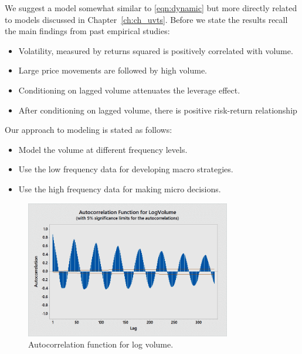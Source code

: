 We suggest a model somewhat similar to \eqref{eqn:dynamic} but more directly related to models discussed in Chapter~\ref{ch:ch_uvts}. Before we state the results recall the main findings from past empirical studies:
	\begin{itemize}
	\item Volatility, measured by returns squared is positively correlated with volume.
	\item Large price movements are followed by high volume.
	\item Conditioning on lagged volume attenuates the leverage effect.
	\item After conditioning on lagged volume, there is positive risk-return relationship
	\end{itemize}
Our approach to modeling is stated as follows:
	\begin{itemize}
	\item Model the volume at different frequency levels.
	\item Use the low frequency data for developing macro strategies.
	\item Use the high frequency data for making micro decisions.
	\end{itemize}

        \begin{figure}[!ht]
        \centering
        \includegraphics[width=0.8\textwidth]{chapters/chapter_stat_ts/figures/logvol.png}
        \caption{Autocorrelation function for log volume. \label{fig:logvolumeauto}}
        \end{figure}
        
